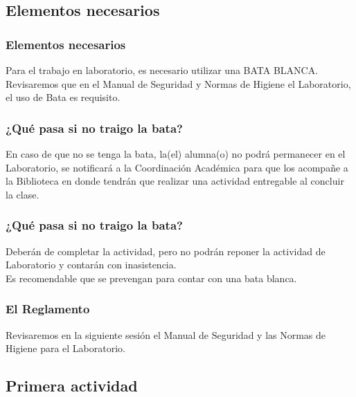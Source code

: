 \documentclass[14pt]{beamer}
\begin{document}
\subsection{Elementos necesarios}

\begin{frame}
\frametitle{Elementos necesarios}
Para el trabajo en laboratorio, es necesario utilizar una BATA BLANCA.
\\
\bigskip
\pause
Revisaremos que en el Manual de Seguridad y Normas de Higiene el Laboratorio, el uso de Bata es requisito.
\end{frame}
\begin{frame}
\frametitle{¿Qué pasa si no traigo la bata?}
En caso de que no se tenga la bata, la(el) alumna(o) no podrá permanecer en el Laboratorio, \pause se notificará a la Coordinación Académica para que los acompañe a la Biblioteca en donde tendrán que realizar una actividad entregable al concluir la clase.
\end{frame}
\begin{frame}
\frametitle{¿Qué pasa si no traigo la bata?}
Deberán de completar la actividad, pero no podrán reponer la actividad de Laboratorio y contarán con inasistencia.
\\
\bigskip
\pause
Es recomendable que se prevengan para contar con una bata blanca.
\end{frame}

\begin{frame}
\frametitle{El Reglamento}
Revisaremos en la siguiente sesión el Manual de Seguridad y las Normas de Higiene para el Laboratorio.
\end{frame}

\subsection{Primera actividad}
\end{document}
